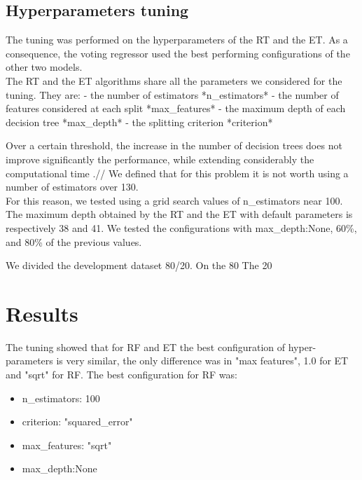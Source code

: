 \documentclass[conference]{IEEEtran}
\begin{document}
\subsection{Hyperparameters tuning}
The tuning was performed on the hyperparameters of the RT and the ET. As a consequence, the voting regressor used the best performing configurations of the other two models. \\
The RT and the ET algorithms share all the parameters we considered for the tuning. They are:
- the number of estimators *n\_estimators*
- the number of features considered at each split *max\_features*
- the maximum depth of each decision tree *max\_depth*
- the splitting criterion *criterion*

Over a certain threshold, the increase in the number of decision trees does not improve significantly the performance, while extending considerably the computational time \cite{paper:howManyTree}.// 
We defined that for this problem it is not worth using a number of estimators over 130.\\  
For this reason, we tested using a grid search values of n_estimators near 100.\\

The maximum depth obtained by the RT and the ET with default parameters is respectively 38 and 41. We tested the configurations with max\_depth:None, 60\%, and 80\% of the previous values. 

We divided the development dataset 80/20. On the 80%
The 20%
\section{Results}
The tuning showed that for RF and ET the best configuration of hyper-parameters is very similar, the only difference was in "max features", 1.0 for ET and "sqrt" for RF.
The best configuration for RF was:

\begin{itemize}
    \item n\_estimators: 100
    \item criterion: "squared\_error"
    \item max\_features: "sqrt"
    \item max\_depth:None
\end{itemize}
\end{document}
